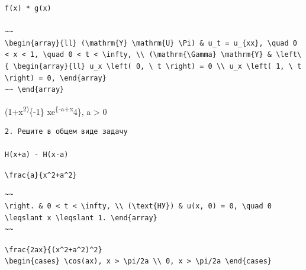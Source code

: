 \documentclass[
  ukrainian,
]{article}
\begin{document}
\begin{verbatim}
f(x) * g(x)

~~
\begin{array}{ll} (\mathrm{Y} \mathrm{U} \Pi) & u_t = u_{xx}, \quad 0 < x < 1, \quad 0 < t < \infty, \\ (\mathrm{\Gamma} \mathrm{Y} & \left\{ \begin{array}{ll} u_x \left( 0, \ t \right) = 0 \\ u_x \left( 1, \ t \right) = 0, \end{array}
~~ \end{array}
\end{verbatim}

(1+x\textsuperscript{2)}\{-1\} xe\textsuperscript{\{-a+x}4\}, a
\textgreater{} 0

\begin{verbatim}
2. Решите в общем виде задачу

H(x+a) - H(x-a)
\end{verbatim}

\texttt{\textbackslash{}frac\{a\}\{x\^{}2+a\^{}2\}}

\begin{verbatim}
~~
\right. & 0 < t < \infty, \\ (\text{НУ}) & u(x, 0) = 0, \quad 0 \leqslant x \leqslant 1. \end{array}
~~
\end{verbatim}

\texttt{\textbackslash{}frac\{2ax\}\{(x\^{}2+a\^{}2)\^{}2\}}
\texttt{\textbackslash{}begin\{cases\}\ \textbackslash{}cos(ax),\ \textbar{}x\textbar{}\ \textgreater{}\ \textbackslash{}pi/2a\ \textbackslash{}\textbackslash{}\ 0,\ \textbar{}x\textbar{}\ \textgreater{}\ \textbackslash{}pi/2a\ \textbackslash{}end\{cases\}}
\end{document}
